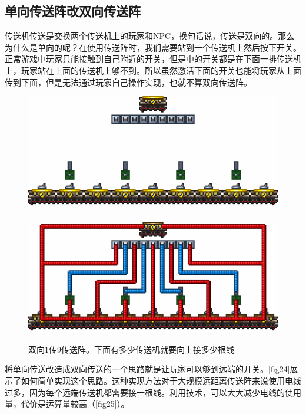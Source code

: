 \subsection{单向传送阵改双向传送阵}
传送机传送是交换两个传送机上的玩家和NPC，换句话说，传送是双向的。那么为什么是单向的呢？在使用传送阵时，我们需要站到一个传送机上然后按下开关。正常游戏中玩家只能接触到自己附近的开关，但是中的开关都是在下面一排传送机上，玩家站在上面的传送机上够不到。所以虽然激活下面的开关也能将玩家从上面传到下面，但是无法通过玩家自己操作实现，也就不算双向传送阵。

\begin{figure}[!ht]
\centering
\includegraphics{images/391.png}\\
\mbox{}\\
\includegraphics{images/392.png}
\caption{双向1传9传送阵。下面有多少传送机就要向上接多少根线}\label{fig24}
\end{figure}

将单向传送改造成双向传送的一个思路就是让玩家可以够到远端的开关。\autoref{fig24}展示了如何简单实现这个思路。这种实现方法对于大规模远距离传送阵来说使用电线过多，因为每个远端传送机都需要接一根线。利用技术，可以大大减少电线的使用量，代价是运算量较高（\autoref{fig25}）。

